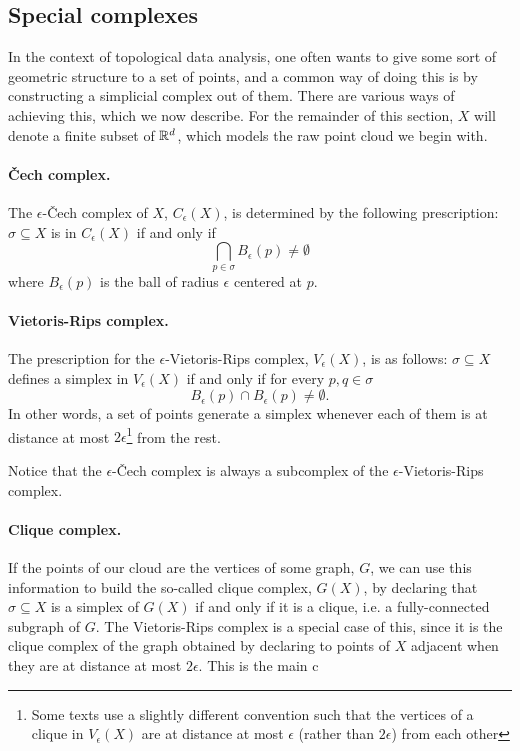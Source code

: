\documentclass[../main.tex]{subfiles}
\begin{document}
\subsection{Special complexes}
In the context of topological data analysis, one often wants to give some sort of
geometric structure to a set of points, and a common way of doing this is by constructing
a simplicial complex out of them. There are various ways of achieving this, which we now
describe. For the remainder of this section, \( X \) will denote a finite subset of \(
\mathbb{R}^d \), which models the raw point cloud we begin with. 

\paragraph{Čech complex.} The \( \epsilon \)-Čech complex of \( X \), \( C_\epsilon(X) \),
is determined by the following prescription: \( \sigma \subseteq X \) is in \(
C_\epsilon(X) \) if and only if \begin{equation*} \bigcap_{p \in \sigma} B_\epsilon(p)
	\neq \emptyset \end{equation*} where \( B_\epsilon(p) \) is the ball of radius \(
	\epsilon \) centered at \( p \). 

\paragraph{Vietoris-Rips complex.} The prescription for the \( \epsilon \)-Vietoris-Rips
complex, \( V_\epsilon(X) \), is as follows: \( \sigma \subseteq X \) defines a simplex in
\( V_\epsilon(X) \) if and only if for every \( p, q \in \sigma \) 
\begin{equation*}
	B_\epsilon(p) \cap B_\epsilon(p) \neq \emptyset.
\end{equation*}
In other words, a set of points generate a simplex whenever each of them is at distance at
most \( 2\epsilon \)\footnote{Some texts use a slightly different convention such that the
vertices of a clique in	\( V_\epsilon(X) \) are at distance at most \( \epsilon \) (rather
than \( 2\epsilon \)) from each other} from the rest. 

Notice that the \( \epsilon \)-Čech complex is always a subcomplex of the \( \epsilon
\)-Vietoris-Rips complex. 

\paragraph{Clique complex.} If the points of our cloud are the vertices of some graph, \(
G \), we can use this information to build the so-called clique complex, \( G(X)
\), by declaring that \( \sigma \subseteq X \) is a simplex of \( G(X) \) if and
only if it is a clique, i.e. a fully-connected subgraph of \( G \). The Vietoris-Rips
complex is a special case of this, since it is the clique complex of the graph obtained by
declaring to points of \( X \) adjacent when they are at distance at most \( 2\epsilon \).
This is the main c
\end{document}

